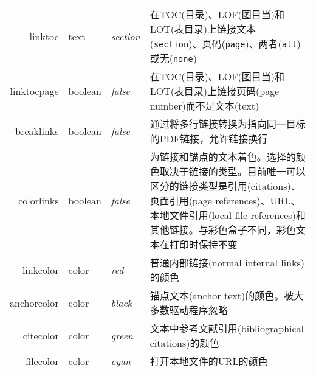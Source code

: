 \documentclass{article}
\begin{document}
\begin{longtable}{@{}>{\ttfamily}rl>{\itshape}lp{8cm}@{}}
  linktoc        & text          & section    & 在TOC(目录)、LOF(图目当)和LOT(表目录)上链接文本(\verb|section|)、页码(\verb|page|)、两者(\verb|all|)或无(\verb|none|)                                                                                                                         \\
  linktocpage    & boolean       & false      & 在TOC(目录)、LOF(图目当)和LOT(表目录)上链接页码(page number)而不是文本(text)                                                                                                                                                               \\
  breaklinks     & boolean       & false      & 通过将多行链接转换为指向同一目标的PDF链接，允许链接换行                                                                                                                                                                                         \\
  colorlinks     & boolean       & false      & 为链接和锚点的文本着色。选择的颜色取决于链接的类型。目前唯一可以区分的链接类型是引用(citations)、页面引用(page references)、URL、本地文件引用(local file references)和其他链接。与彩色盒子不同，彩色文本在打印时保持不变                                                                               \\
  linkcolor      & color         & red        & 普通内部链接(normal internal links)的颜色                                                                                                                                                                                      \\
  anchorcolor    & color         & black      & 锚点文本(anchor text)的颜色。被大多数驱动程序忽略                                                                                                                                                                                       \\
  citecolor      & color         & green      & 文本中参考文献引用(bibliographical citations)的颜色                                                                                                                                                                               \\
  filecolor      & color         & cyan       & 打开本地文件的URL的颜色                                                                                                                                                                                                         \\

\end{longtable}
\end{document}
